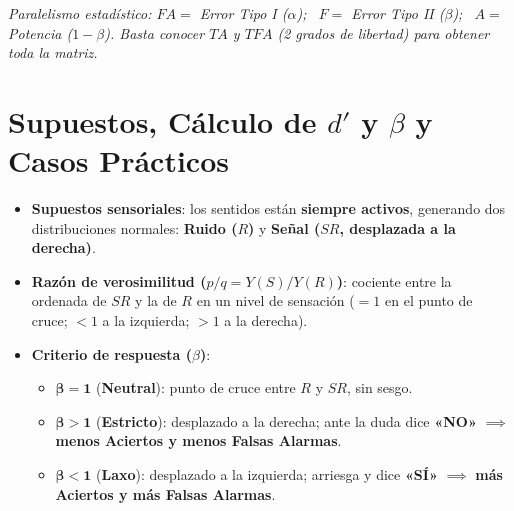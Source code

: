 \documentclass[11pt,a4paper]{article}
\begin{document}
\textit{Paralelismo estadístico: $FA =$ Error Tipo I ($\alpha$); \ $F =$ Error Tipo II ($\beta$); \ $A =$ Potencia ($1-\beta$). Basta conocer $TA$ y $TFA$ (2 grados de libertad) para obtener toda la matriz.}

\section{Supuestos, Cálculo de $d'$ y $\beta$ y Casos Prácticos}

\begin{itemize}
  \item \textbf{Supuestos sensoriales}: los sentidos están \textbf{siempre activos}, generando dos distribuciones normales: \textbf{Ruido ($R$)} y \textbf{Señal ($SR$, desplazada a la derecha)}.
  \item \textbf{Razón de verosimilitud ($p/q = Y(S)/Y(R)$)}: cociente entre la ordenada de $SR$ y la de $R$ en un nivel de sensación ($=1$ en el punto de cruce; $<1$ a la izquierda; $>1$ a la derecha).
  \item \textbf{Criterio de respuesta ($\beta$)}:
  \begin{itemize}
    \item $\mathbf{\beta = 1}$ (\textbf{Neutral}): punto de cruce entre $R$ y $SR$, sin sesgo.
    \item $\mathbf{\beta > 1}$ (\textbf{Estricto}): desplazado a la derecha; ante la duda dice \textbf{«NO»} $\implies$ \textbf{menos Aciertos y menos Falsas Alarmas}.
    \item $\mathbf{\beta < 1}$ (\textbf{Laxo}): desplazado a la izquierda; arriesga y dice \textbf{«SÍ»} $\implies$ \textbf{más Aciertos y más Falsas Alarmas}.
  \end{itemize}
\end{itemize}
\end{document}
